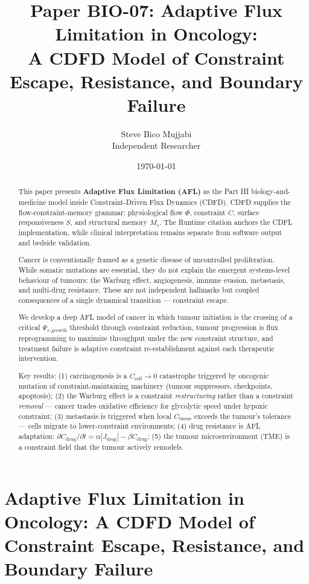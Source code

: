 \documentclass[12pt,a4paper]{article}
\title{\textbf{Paper BIO-07: Adaptive Flux Limitation in Oncology:\\ A CDFD Model of Constraint Escape, Resistance, and Boundary Failure}}
\author{Steve Bico Mujjabi\\ \small Independent Researcher}
\date{\today}
\begin{document}
\maketitle

\clearpage
\section*{Adaptive Flux Limitation in Oncology: A CDFD Model of Constraint Escape, Resistance, and Boundary Failure}

\begin{abstract}

This paper presents \textbf{Adaptive Flux Limitation (AFL)} as the Part III biology-and-medicine model inside Constraint-Driven Flux Dynamics (CDFD). CDFD supplies the flow-constraint-memory grammar: physiological flow $\Phi$, constraint $C$, surface responsiveness $S$, and structural memory $M_s$. The Runtime citation anchors the CDFL implementation, while clinical interpretation remains separate from software output and bedside validation.

Cancer is conventionally framed as a genetic disease of uncontrolled proliferation. While somatic mutations are essential, they do not explain the emergent systems-level behaviour of tumours: the Warburg effect, angiogenesis, immune evasion, metastasis, and multi-drug resistance. These are not independent hallmarks but coupled consequences of a single dynamical transition --- constraint escape.

We develop a deep AFL model of cancer in which tumour initiation is the crossing of a critical $\Psi_{s,\mathrm{growth}}$ threshold through constraint reduction, tumour progression is flux reprogramming to maximize throughput under the new constraint structure, and treatment failure is adaptive constraint re-establishment against each therapeutic intervention.

Key results: (1) carcinogenesis is a $C_{\mathrm{cell}} \to 0$ catastrophe triggered by oncogenic mutation of constraint-maintaining machinery (tumour suppressors, checkpoints, apoptosis); (2) the Warburg effect is a constraint \textit{restructuring} rather than a constraint \textit{removal} --- cancer trades oxidative efficiency for glycolytic speed under hypoxic constraint; (3) metastasis is triggered when local $C_{\mathrm{tissue}}$ exceeds the tumour's tolerance --- cells migrate to lower-constraint environments; (4) drug resistance is AFL adaptation: $\partial C_{\mathrm{drug}} / \partial t = \alpha |J_{\mathrm{drug}}| - \beta C_{\mathrm{drug}}$; (5) the tumour microenvironment (TME) is a constraint field that the tumour actively remodels.


\end{abstract}
\end{document}
